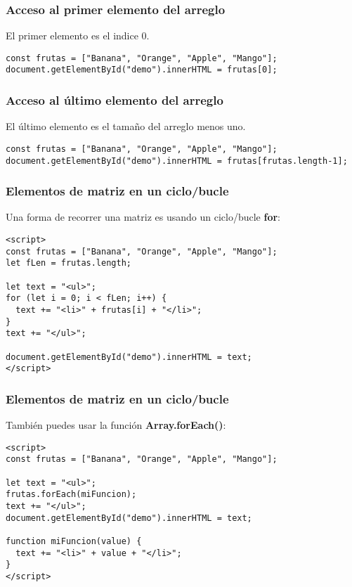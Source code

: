 \begin{frame}[fragile]
  \frametitle{Acceso al primer elemento del arreglo}

  El primer elemento es el indice 0.

  \vspace{\baselineskip}
  \begin{lstlisting}
const frutas = ["Banana", "Orange", "Apple", "Mango"];
document.getElementById("demo").innerHTML = frutas[0];
  \end{lstlisting}
\end{frame}

\begin{frame}[fragile]
  \frametitle{Acceso al último elemento del arreglo}

  El último elemento es el tamaño del arreglo menos uno.

  \vspace{\baselineskip}
  \begin{lstlisting}
const frutas = ["Banana", "Orange", "Apple", "Mango"];
document.getElementById("demo").innerHTML = frutas[frutas.length-1];
  \end{lstlisting}
\end{frame}

\begin{frame}[fragile]
  \frametitle{Elementos de matriz en un ciclo/bucle}

  Una forma de recorrer una matriz es usando un ciclo/bucle
  \textbf{for}:

  \vspace{\baselineskip}
  \begin{lstlisting}
<script>
const frutas = ["Banana", "Orange", "Apple", "Mango"];
let fLen = frutas.length;

let text = "<ul>";
for (let i = 0; i < fLen; i++) {
  text += "<li>" + frutas[i] + "</li>";
}
text += "</ul>";

document.getElementById("demo").innerHTML = text;
</script>
  \end{lstlisting}
\end{frame}

\begin{frame}[fragile]
  \frametitle{Elementos de matriz en un ciclo/bucle}

  También puedes usar la función \textbf{Array.forEach()}:

  \vspace{\baselineskip}
  \begin{lstlisting}
<script>
const frutas = ["Banana", "Orange", "Apple", "Mango"];

let text = "<ul>";
frutas.forEach(miFuncion);
text += "</ul>";
document.getElementById("demo").innerHTML = text;

function miFuncion(value) {
  text += "<li>" + value + "</li>";
} 
</script>
  \end{lstlisting}
\end{frame}

